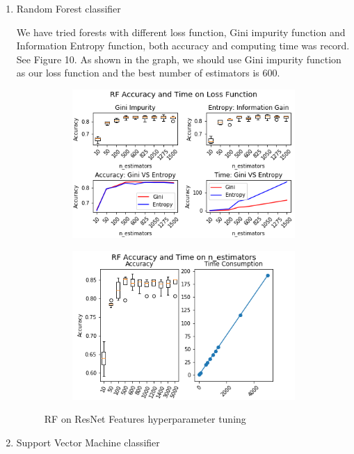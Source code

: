 \documentclass[11.5pt]{article}
\begin{document}
\begin{enumerate}
\begin{itemize}
\begin{enumerate}
                \item Random Forest classifier

                We have tried forests with different loss function, Gini impurity function and Information Entropy function, both accuracy and computing time was record. See Figure 10. As shown in the graph, we should use Gini impurity function as our loss function and the best number of estimators is $600$.

                \begin{figure}[h!]
                    \begin{subfigure}[b]{0.5\linewidth}
                        \centering
                        \includegraphics[width=0.7\linewidth]{images/res_tradi_RF_penalty.png}
                    \end{subfigure}
                    \begin{subfigure}[b]{0.5\linewidth}
                        \centering
                        \includegraphics[width=0.7\linewidth]{images/res_tradi_RF_n_estimators.png}
                    \end{subfigure}
                    \caption{RF on ResNet Features hyperparameter tuning}
                \end{figure}

                \item Support Vector Machine classifier


\end{enumerate}
\end{itemize}
\end{enumerate}
\end{document}
